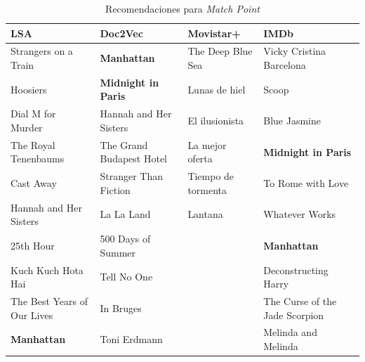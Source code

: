 \documentclass[withindex, glossary]{cam-thesis}
\begin{document}
\begin{table}
    \begin{tabularx}{\textwidth}{XXXX}
        \toprule
        \hiderowcolors{}LSA & Doc2Vec & Movistar+ & IMDb\\
        \midrule
        \showrowcolors{}Strangers on a Train & \textbf{Manhattan} & The Deep Blue Sea & Vicky Cristina Barcelona\\
        Hoosiers & \textbf{Midnight in Paris} & Lunas de hiel & Scoop\\
        Dial M for Murder & Hannah and Her Sisters & El ilusionista & Blue Jasmine\\
        The Royal Tenenbaums & The Grand Budapest Hotel & La mejor oferta & \textbf{Midnight in Paris}\\
        Cast Away & Stranger Than Fiction & Tiempo de tormenta & To Rome with Love\\
        Hannah and Her Sisters & La La Land & Lantana & Whatever Works\\
        25th Hour & 500 Days of Summer & & \textbf{Manhattan}\\
        Kuch Kuch Hota Hai & Tell No One & & Deconstructing Harry\\
        The Best Years of Our Lives & In Bruges & & The Curse of the Jade Scorpion\\
        \textbf{Manhattan} & Toni Erdmann & & Melinda and Melinda\\
        \bottomrule
    \end{tabularx}
    \caption{Recomendaciones para \textit{Match Point}}
\end{table}
\end{document}
